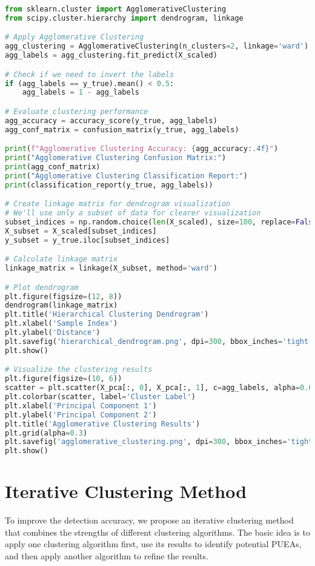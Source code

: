 \begin{lstlisting}[language=Python, caption=Agglomerative Clustering Code]
from sklearn.cluster import AgglomerativeClustering
from scipy.cluster.hierarchy import dendrogram, linkage

# Apply Agglomerative Clustering
agg_clustering = AgglomerativeClustering(n_clusters=2, linkage='ward')
agg_labels = agg_clustering.fit_predict(X_scaled)

# Check if we need to invert the labels
if (agg_labels == y_true).mean() < 0.5:
    agg_labels = 1 - agg_labels

# Evaluate clustering performance
agg_accuracy = accuracy_score(y_true, agg_labels)
agg_conf_matrix = confusion_matrix(y_true, agg_labels)

print(f"Agglomerative Clustering Accuracy: {agg_accuracy:.4f}")
print("Agglomerative Clustering Confusion Matrix:")
print(agg_conf_matrix)
print("Agglomerative Clustering Classification Report:")
print(classification_report(y_true, agg_labels))

# Create linkage matrix for dendrogram visualization
# We'll use only a subset of data for clearer visualization
subset_indices = np.random.choice(len(X_scaled), size=100, replace=False)
X_subset = X_scaled[subset_indices]
y_subset = y_true.iloc[subset_indices]

# Calculate linkage matrix
linkage_matrix = linkage(X_subset, method='ward')

# Plot dendrogram
plt.figure(figsize=(12, 8))
dendrogram(linkage_matrix)
plt.title('Hierarchical Clustering Dendrogram')
plt.xlabel('Sample Index')
plt.ylabel('Distance')
plt.savefig('hierarchical_dendrogram.png', dpi=300, bbox_inches='tight')
plt.show()

# Visualize the clustering results
plt.figure(figsize=(10, 6))
scatter = plt.scatter(X_pca[:, 0], X_pca[:, 1], c=agg_labels, alpha=0.6, cmap='viridis')
plt.colorbar(scatter, label='Cluster Label')
plt.xlabel('Principal Component 1')
plt.ylabel('Principal Component 2')
plt.title('Agglomerative Clustering Results')
plt.grid(alpha=0.3)
plt.savefig('agglomerative_clustering.png', dpi=300, bbox_inches='tight')
plt.show()
\end{lstlisting}

\section{Iterative Clustering Method}
To improve the detection accuracy, we propose an iterative clustering method that combines the strengths of different clustering algorithms. The basic idea is to apply one clustering algorithm first, use its results to identify potential PUEAs, and then apply another algorithm to refine the results.

